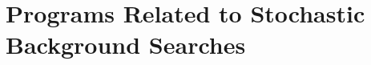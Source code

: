 \section{Programs Related to Stochastic Background Searches}
\label{section:stochastic}


\clearpage

